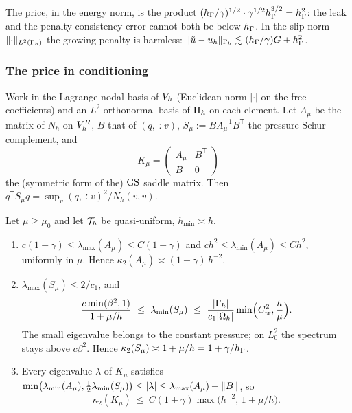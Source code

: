 The price, in the energy norm, is the product $(h_\Gamma/\gamma)^{1/2}\cdot\gamma^{1/2}h_\Gamma^{3/2}=h_\Gamma^2$: the leak and the penalty consistency error cannot both be below $h_\Gamma$. In the slip norm $\lVert \cdot\rVert_{L^2(\Gamma_h)}$ the growing penalty is harmless: $\lVert \tilde u-u_h\rVert_{\Gamma_h}\lesssim(h_\Gamma/\gamma)G+h_\Gamma^2$.

\subsubsection{The price in conditioning}

Work in the Lagrange nodal basis of $V_h$ (Euclidean norm $|\cdot|$ on the free coefficients) and an $L^2$-orthonormal basis of $\Pi_h$ on each element. Let $A_\mu$ be the matrix of $N_h$ on $V_h^R$, $B$ that of $(q,\div v)$, $S_\mu:=BA_\mu^{-1}B^{\mathsf T}$ the pressure Schur complement, and
\[
K_\mu=\begin{pmatrix}A_\mu&B^{\mathsf T}\\ B&0\end{pmatrix}
\]
the (symmetric form of the) $\mathrm{GS}$ saddle matrix. Then $q^{\mathsf T}S_\mu q=\sup_v(q,\div v)^2/N_h(v,v)$.

\begin{proposition}[Conditioning]\label{rs:cond}
Let $\mu\ge\mu_0$ and let $\mathcal T_h$ be quasi-uniform, $h_{\min}\asymp h$.
\begin{enumerate}[label=(\roman*)]
\item $c(1+\gamma)\le\lambda_{\max}(A_\mu)\le C(1+\gamma)$ and $ch^2\le\lambda_{\min}(A_\mu)\le Ch^2$, uniformly in $\mu$. Hence $\kappa_2(A_\mu)\asymp(1+\gamma)\,h^{-2}$.
\item $\lambda_{\max}(S_\mu)\le2/c_1$, and
\[
\frac{c\min(\beta^2,1)}{1+\mu/h}\ \le\ \lambda_{\min}(S_\mu)\ \le\ \frac{|\Gh|}{c_1|\Oh|}\min\Bigl(C_{\mathrm{tr}}^2,\frac h\mu\Bigr).
\]
The small eigenvalue belongs to the constant pressure; on $L^2_0$ the spectrum stays above $c\beta^2$. Hence $\kappa_2(S_\mu)\asymp1+\mu/h=1+\gamma/h_\Gamma$.
\item Every eigenvalue $\lambda$ of $K_\mu$ satisfies $\min\bigl(\lambda_{\min}(A_\mu),\tfrac12\lambda_{\min}(S_\mu)\bigr)\le|\lambda|\le\lambda_{\max}(A_\mu)+\lVert B\rVert$, so
\[
\kappa_2(K_\mu)\ \le\ C(1+\gamma)\max\bigl(h^{-2},\,1+\mu/h\bigr).
\]
\end{enumerate}
\end{proposition}

